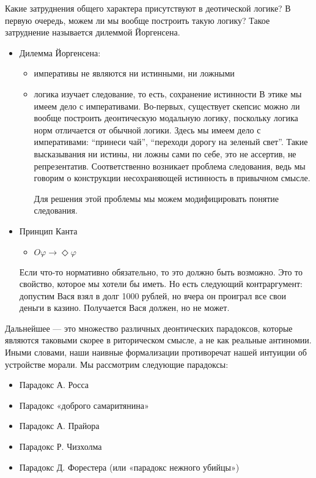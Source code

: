 \documentclass[openany]{book}
\theoremstyle{plain}
\theoremstyle{definition}
\begin{document}
Какие затруднения общего характера присутствуют в деотической логике? В первую очередь, можем ли мы вообще построить такую логику? Такое затруднение называется дилеммой Йоргенсена.
\begin{itemize}
    \item Дилемма Йоргенсена:
	\begin{itemize}
	    \item императивы не являются ни истинными, ни ложными
	    \item логика изучает следование, то есть, сохранение истинности
		В этике мы имеем дело с императивами. Во-первых, существует скепсис можно ли вообще построить деонтическую модальную логику, поскольку логика норм отличается от обычной логики. Здесь мы имеем дело с императивами: ``принеси чай'', ``переходи дорогу на зеленый свет''. Такие высказывания ни истины, ни ложны сами по себе, это не ассертив, не репрезентатив. Соответственно возникает проблема следования, ведь мы говорим о конструкции несохраняющей истинность в привычном смысле. 

		Для решения этой проблемы мы можем модифицировать понятие следования.
	\end{itemize}
    \item Принцип Канта
	\begin{itemize}
	    \item \(O \varphi \to \Diamond \varphi\)
	\end{itemize}
	Если что-то нормативно обязательно, то это должно быть возможно. Это то свойство, которое мы хотели бы иметь. Но есть следующий контраргумент: допустим Вася взял в долг 1000 рублей, но вчера он проиграл все свои деньги в казино. Получается Вася должен, но не может.
\end{itemize}

Дальнейшее --- это множество различных деонтических парадоксов, которые являются таковыми скорее в риторическом смысле, а не как реальные антиномии. Иными словами, наши наивные формализации противоречат нашей интуиции об устройстве морали. Мы рассмотрим следующие парадоксы:
\begin{itemize}
    \item Парадокс А. Росса
    \item Парадокс «доброго самаритянина»
    \item Парадокс А. Прайора
    \item Парадокс Р. Чизхолма
    \item Парадокс Д. Форестера (или «парадокс нежного убийцы»)
\end{itemize}
\end{document}
